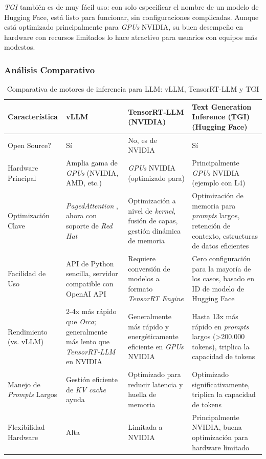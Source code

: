 \textit{TGI} también es de muy fácil uso: con solo especificar el nombre de un modelo de Hugging Face, está listo para funcionar, sin configuraciones complicadas. Aunque está optimizado principalmente para \textit{GPUs} NVIDIA, su buen desempeño en hardware con recursos limitados lo hace atractivo para usuarios con equipos más modestos.

\subsubsection*{Análisis Comparativo}
\begin{table}[H]
\centering
\begin{tabular}{|p{3.5cm}|p{3cm}|p{3cm}|p{3cm}|}
\hline
\textbf{Característica} & \textbf{vLLM} & \textbf{TensorRT-LLM (NVIDIA)} & \textbf{Text Generation Inference (TGI) (Hugging Face)} \\
\hline
Open Source? & Sí & No, es de NVIDIA & Sí \\
\hline
Hardware Principal & Amplia gama de \textit{GPUs} (NVIDIA, AMD, etc.) & \textit{GPUs} NVIDIA (optimizado para) & Principalmente \textit{GPUs} NVIDIA (ejemplo con L4) \\
\hline
Optimización Clave & \textit{PagedAttention} \cite{ref39}, ahora con soporte de \textit{Red Hat} & Optimización a nivel de \textit{kernel}, fusión de capas, gestión dinámica de memoria & Optimización de memoria para \textit{prompts} largos, retención de contexto, estructuras de datos eficientes \\
\hline
Facilidad de Uso & API de Python sencilla, servidor compatible con OpenAI API & Requiere conversión de modelos a formato \textit{TensorRT Engine} & Cero configuración para la mayoría de los casos, basado en ID de modelo de Hugging Face \\
\hline
Rendimiento (vs. vLLM) & 2-4x más rápido que \textit{Orca}; generalmente más lento que \textit{TensorRT-LLM} en NVIDIA & Generalmente más rápido y energéticamente eficiente en \textit{GPUs} NVIDIA & Hasta 13x más rápido en \textit{prompts} largos (>200.000 tokens), triplica la capacidad de tokens \\
\hline
Manejo de \textit{Prompts} Largos & Gestión eficiente de \textit{KV cache} ayuda & Optimizado para reducir latencia y huella de memoria & Optimizado significativamente, triplica la capacidad de tokens \\
\hline
Flexibilidad Hardware & Alta & Limitada a NVIDIA & Principalmente NVIDIA, buena optimización para hardware limitado \\
\hline
\end{tabular}
\captionsetup{justification=centering}
\caption{Comparativa de motores de inferencia para LLM: vLLM, TensorRT-LLM y TGI}
\label{tab:comparativa_motores_inferencia}
\end{table}

